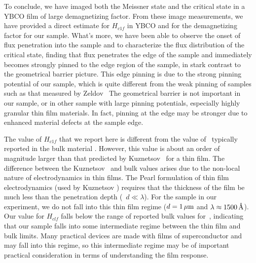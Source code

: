 %
%
To conclude, we have imaged both the Meissner state and the critical state in
a YBCO film of large demagnetizing factor. From these image 
measurements, we have provided a direct estimate for $H_{c1f}$ in 
YBCO and for the demagnetizing factor for our sample. 
What's more, we have been able to observe the onset of flux penetration
into the sample and to characterize the flux distribution of the 
critical state, finding that flux penetrates the edge of the 
sample and immediately becomes strongly pinned to the edge region
of the sample, in stark contrast to the geometrical barrier picture. 
This edge pinning is due to the strong pinning potential of our
sample, which is quite different from the weak pinning of samples 
such as that measured by Zeldov \etal\,\cite{zeldov_prl_73_1428_1994}
The geometrical barrier is not important in our sample, or in other
sample with large pinning potentials, especially highly granular
thin film materials. In fact, pinning at the edge may be stronger
due to enhanced material defects at the sample edge. 

% 
%
\index{\hcone}

The value of $H_{c1f}$ that we report here is different from the value
of \hcone\ typically reported in the bulk material
\cite{liang_prb_50_4212_1994}. 
However, this value is about an order of magnitude larger than that
predicted by Kuznetsov
\etal\ for a thin film. The difference between the Kuznetsov \etal\ and 
bulk values arises due to the non-local nature of electrodynamics
in thin films.
The Pearl formulation of thin film electrodynamics
\cite{pearl_apl_5_65_1964,pearl_lt9_566_1965} (used by Kuznetsov \etal)
requires that the thickness of the film be much less than the penetration
depth (\ie\ $d \ll \lambda$). For the sample in our experiment, we do not
fall into this thin film regime ($d=1\,\mu\mathrm{m}$ and 
$\lambda \approx 1500\,\mbox{\AA}$). Our value for 
$H_{clf}$ falls below  the range of reported  
bulk values for \hcone\,\cite{liang_prb_50_4212_1994}, indicating
that our sample falls into some intermediate regime between the thin film
and bulk limits. Many practical devices are made with films of
superconductor and may fall into this regime, so this intermediate
regime may be of important practical consideration in terms of 
understanding the film response.

